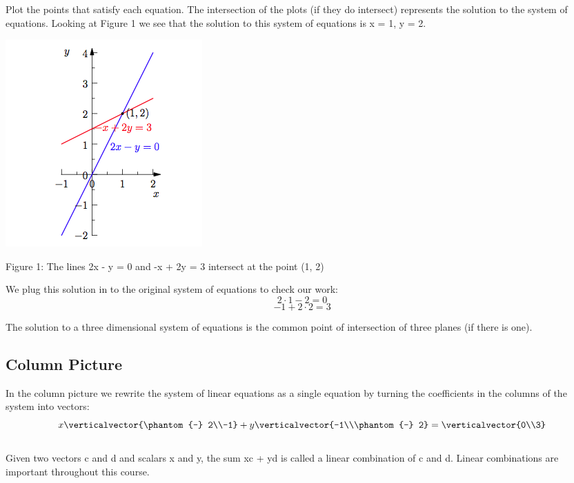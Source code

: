 \documentclass{ximera}
\begin{document}
\noindent
Plot the points that satisfy each equation. The intersection of the plots (if they do intersect) represents the solution to the system of equations. Looking at Figure 1 we see that the solution to this system of equations is x = 1, y = 2.

\begin{center}
\includegraphics{Geometry1.png}

Figure 1: The lines 2x - y = 0 and -x + 2y = 3 intersect at the point (1, 2)
\end{center}

\noindent
We plug this solution in to the original system of equations to check our work:\\

\[2\cdot1-2 = 0\]
\[-1+2\cdot2 = 3\]

The solution to a three dimensional system of equations is the common point of intersection of three planes (if there is one).

\subsection*{Column Picture}

\noindent
In the column picture we rewrite the system of linear equations as a single equation by turning the coefficients in the columns of the system into vectors:\\

\[x\verticalvector{\phantom{-} 2\\-1} + y\verticalvector{-1\\\phantom{-} 2} = \verticalvector{0\\3}\]\\

Given two vectors c and d and scalars x and y, the sum xc + yd is called a linear combination of c and d. Linear combinations are important throughout this course.
\end{document}
